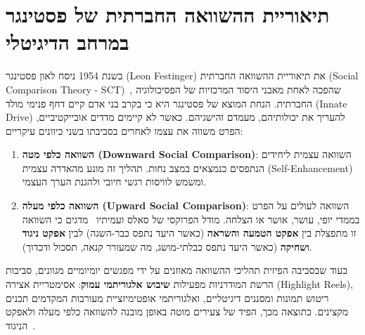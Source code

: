 \section{תיאוריית ההשוואה החברתית של פסטינגר במרחב הדיגיטלי}
\label{sec:lit_sct}
בשנת 1954 ניסח לאון פסטינגר (\textenglish{Leon Festinger}) את תיאוריית ההשוואה החברתית (\textenglish{Social Comparison Theory - SCT})~\cite{festinger1954theory}, שהפכה לאחת מאבני היסוד המרכזיות של הפסיכולוגיה החברתית. הנחת המוצא של פסטינגר היא כי בקרב בני אדם קיים דחף פנימי מולד (\textenglish{Innate Drive}) להעריך את יכולותיהם, מעמדם והישגיהם. כאשר לא קיימים מדדים אובייקטיביים, הפרט משווה את עצמו לאחרים בסביבתו בשני כיוונים עיקריים:
\begin{enumerate}
    \item \textbf{השוואה כלפי מטה (\textenglish{Downward Social Comparison})}: השוואה עצמית ליחידים הנתפסים כנמצאים במצב נחות. תהליך זה מונע מהאדרה עצמית (\textenglish{Self-Enhancement}) ומשמש לוויסות רגשי חיובי ולהגנת הערך העצמי.
    \item \textbf{השוואה כלפי מעלה (\textenglish{Upward Social Comparison})}: השוואה לעולים על הפרט בממדי יופי, עושר, אושר או הצלחה. מודל הפרוקסי של סאלס ועמיתיו~\cite{suls2002social} מדגים כי השוואה זו מתפצלת בין \textbf{אפקט הטמעה והשראה} (כאשר היעד נתפס כבר-השגה) לבין \textbf{אפקט ניגוד ושחיקה} (כאשר היעד נתפס כבלתי-מושג, מה שמעורר קנאה, תסכול ודכדוך).
\end{enumerate}

בעוד שבסביבה הפיזית תהליכי ההשוואה מאוזנים על ידי מפגשים יומיומיים מגוונים, סביבות הרשת המודרניות מפעילות \textbf{שיבוש אלגוריתמי עמוק}: אסימטריית אצירה (\textenglish{Highlight Reels}), ריטוש תמונות ומסננים דיגיטליים, ואלגוריתמי אופטימיזציית מעורבות המקדמים תכנים מקצינים. כתוצאה מכך, הפיד של צעירים מוטה באופן מובנה להשוואה כלפי מעלה ולאפקט הניגוד~\cite{appel2015social, appel2016interplay}.

